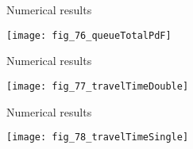 
\begin{frame}{Numerical results}
    \begin{center}
    \end{center}
    \begin{center}
    \texttt{[image: fig\_76\_queueTotalPdF]}
    \end{center}
    \end{frame}
    
    \begin{frame}{Numerical results}
    \begin{center}
    \texttt{[image: fig\_77\_travelTimeDouble]}
    \end{center}
    \end{frame}
    
    \begin{frame}{Numerical results}
    \begin{center}
    \texttt{[image: fig\_78\_travelTimeSingle]}
    \end{center}
\end{frame}
